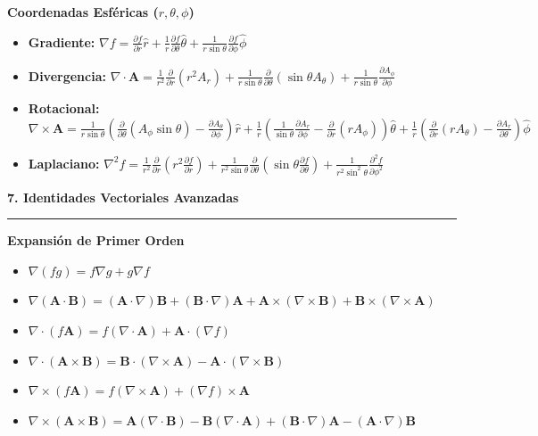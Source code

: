 \documentclass[10pt, landscape, twocolumn]{article}
\newcommand{\cheatsheetsection}[1]{
    \vspace{0.8em}
    {\color{themeblue}\large\bfseries #1} \par
    \vspace{-0.4em}
    {\color{themeblue}\rule{\linewidth}{1pt}} \par
    \vspace{0.3em}
}
\newcommand{\cheatsheetsubsection}[1]{
    \vspace{0.5em}
    {\color{themeblue}\normalsize\bfseries #1} \par
    \vspace{0.2em}
}
\begin{document}
\cheatsheetsubsection{Coordenadas Esféricas ($r, \theta, \phi$)}
\begin{itemize}[leftmargin=*, nosep]
    \item \textbf{Gradiente:} $\nabla f = \frac{\partial f}{\partial r}\hat{r} + \frac{1}{r}\frac{\partial f}{\partial \theta}\hat{\theta} + \frac{1}{r\sin\theta}\frac{\partial f}{\partial \phi}\hat{\phi}$
    \item \textbf{Divergencia:} $\nabla \cdot \mathbf{A} = \frac{1}{r^2}\frac{\partial}{\partial r}(r^2 A_r) + \frac{1}{r\sin\theta}\frac{\partial}{\partial \theta}(\sin\theta A_\theta) + \frac{1}{r\sin\theta}\frac{\partial A_\phi}{\partial \phi}$
    \item \textbf{Rotacional:} $\nabla \times \mathbf{A} = \frac{1}{r\sin\theta}\left( \frac{\partial}{\partial \theta}(A_\phi \sin\theta) - \frac{\partial A_\theta}{\partial \phi} \right)\hat{r} + \frac{1}{r}\left( \frac{1}{\sin\theta}\frac{\partial A_r}{\partial \phi} - \frac{\partial}{\partial r}(r A_\phi) \right)\hat{\theta} + \frac{1}{r}\left( \frac{\partial}{\partial r}(r A_\theta) - \frac{\partial A_r}{\partial \theta} \right)\hat{\phi}$
    \item \textbf{Laplaciano:} $\nabla^2 f = \frac{1}{r^2}\frac{\partial}{\partial r}\left(r^2 \frac{\partial f}{\partial r}\right) + \frac{1}{r^2\sin\theta}\frac{\partial}{\partial \theta}\left(\sin\theta \frac{\partial f}{\partial \theta}\right) + \frac{1}{r^2\sin^2\theta}\frac{\partial^2 f}{\partial \phi^2}$
\end{itemize}

\newpage
\cheatsheetsection{7. Identidades Vectoriales Avanzadas}
\cheatsheetsubsection{Expansión de Primer Orden}
\begin{itemize}[leftmargin=*, nosep]
    \item $\nabla (fg) = f \nabla g + g \nabla f$
    \item $\nabla (\mathbf{A} \cdot \mathbf{B}) = (\mathbf{A} \cdot \nabla)\mathbf{B} + (\mathbf{B} \cdot \nabla)\mathbf{A} + \mathbf{A} \times (\nabla \times \mathbf{B}) + \mathbf{B} \times (\nabla \times \mathbf{A})$
    \item $\nabla \cdot (f \mathbf{A}) = f (\nabla \cdot \mathbf{A}) + \mathbf{A} \cdot (\nabla f)$
    \item $\nabla \cdot (\mathbf{A} \times \mathbf{B}) = \mathbf{B} \cdot (\nabla \times \mathbf{A}) - \mathbf{A} \cdot (\nabla \times \mathbf{B})$
    \item $\nabla \times (f \mathbf{A}) = f (\nabla \times \mathbf{A}) + (\nabla f) \times \mathbf{A}$
    \item $\nabla \times (\mathbf{A} \times \mathbf{B}) = \mathbf{A}(\nabla \cdot \mathbf{B}) - \mathbf{B}(\nabla \cdot \mathbf{A}) + (\mathbf{B} \cdot \nabla)\mathbf{A} - (\mathbf{A} \cdot \nabla)\mathbf{B}$
\end{itemize}
\end{document}
